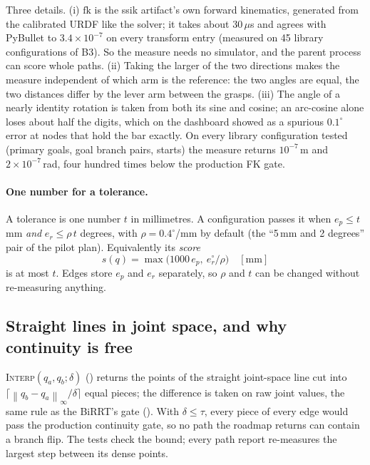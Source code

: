 \documentclass[11pt,a4paper]{article}
\newcommand{\code}[1]{\texttt{\detokenize{#1}}}
\newcommand{\norm}[1]{\left\lVert #1 \right\rVert}
\newcommand{\fn}[1]{\textsc{#1}}
\begin{document}
\noindent
Three details. (i) $\mathrm{fk}$ is the ssik artifact's own forward kinematics,
generated from the calibrated URDF like the solver; it takes about
$30\,\mu$s and agrees with PyBullet to $3.4 \times 10^{-7}$ on every
transform entry (measured on 45 library configurations of B3). So the measure
needs no simulator, and the parent process can score whole paths. (ii) Taking
the larger of the two directions makes the measure independent of which arm is
the reference: the two angles are equal, the two distances differ by the lever
arm between the grasps. (iii) The angle of a nearly identity rotation is taken
from both its sine and cosine; an arc-cosine alone loses about half the digits,
which on the dashboard showed as a spurious $0.1^\circ$ error at nodes that hold
the bar exactly. On every library configuration tested (primary goals, goal
branch pairs, starts) the measure returns $10^{-7}$\,m and $2 \times 10^{-7}$\,rad,
four hundred times below the production FK gate.

\paragraph{One number for a tolerance.}
A tolerance is one number $t$ in millimetres. A configuration passes it when
$e_p \le t$\,mm \emph{and} $e_r \le \rho\, t$ degrees, with
$\rho = 0.4^\circ$/mm by default (the ``5\,mm and 2 degrees'' pair of the pilot
plan). Equivalently its \emph{score}
\begin{equation}
  s(q) = \max\bigl(1000\, e_p,\ e_r^{\circ} / \rho\bigr) \quad [\text{mm}]
  \label{eq:score}
\end{equation}
is at most $t$. Edges store $e_p$ and $e_r$ separately, so $\rho$ and $t$ can be
changed without re-measuring anything.

\subsection{Straight lines in joint space, and why continuity is free}

\fn{Interp}$(q_a, q_b; \delta)$ (\code{interpolate_confs}) returns the points of
the straight joint-space line cut into $\lceil \norm{q_b - q_a}_\infty / \delta
\rceil$ equal pieces; the difference is taken on raw joint values, the same
rule as the BiRRT's gate (\code{core.joint_step_deltas}). With $\delta \le
\tau$, every piece of every edge would pass the production continuity gate, so
no path the roadmap returns can contain a branch flip. The tests check the
bound; every path report re-measures the largest step between its dense points.
\end{document}
